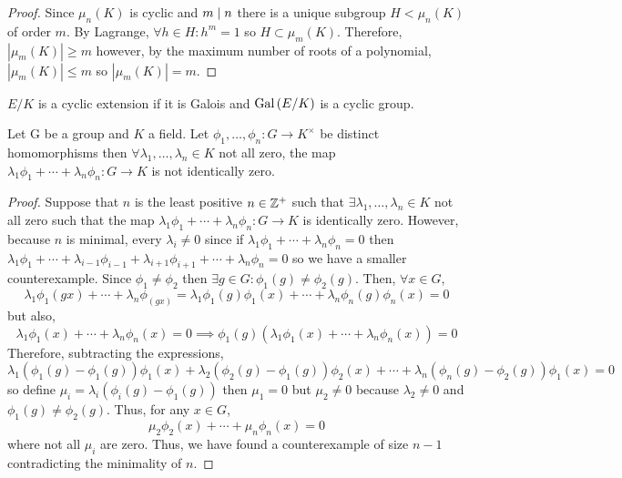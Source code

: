 \documentclass[12pt]{extarticle}
\begin{document}
\begin{proof}
Since $\mu_n(K)$ is cyclic and $m \mid n$ there is a unique subgroup $H < \mu_n(K)$ of order $m$. By Lagrange, $\forall h \in H : h^m = 1$ so $H \subset \mu_m(K)$. Therefore, $|\mu_m(K)| \ge m$ however, by the maximum number of roots of a polynomial, $|\mu_m(K)| \le m$ so $|\mu_m(K)| = m$.  
\end{proof}

\begin{definition}
$E/K$ is a cyclic extension if it is Galois and $\mathrm{Gal}\left( E/K \right)$ is a cyclic group.
\end{definition}

\begin{lemma}
Let G be a group and $K$ a field. Let $\phi_1, \dots, \phi_n : G \to K^\times$ be distinct homomorphisms then $\forall \lambda_1, \dots, \lambda_n \in K$ not all zero, the map $\lambda_1 \phi_1 + \cdots + \lambda_n \phi_n : G \to K$ is not identically zero. 
\end{lemma}

\begin{proof}
Suppose that $n$ is the least positive $n \in \mathbb{Z}^{+}$ such that $\exists \lambda_1, \dots, \lambda_n \in K$ not all zero such that the map $\lambda_1 \phi_1 + \cdots + \lambda_n \phi_n : G \to K$ is identically zero. However, because $n$ is minimal, every $\lambda_i \neq 0$ since if $\lambda_1 \phi_1 + \cdots + \lambda_n \phi_n = 0$ then $\lambda_1 \phi_1 + \cdots  + \lambda_{i-1} \phi_{i-1} + \lambda_{i+1} \phi_{i+1} + \cdots + \lambda_n \phi_n = 0$ so we have a smaller counterexample. Since $\phi_1 \neq \phi_2$ then $\exists g \in G : \phi_1(g) \neq \phi_2(g)$. Then, $\forall x \in G$, 
\[\lambda_1 \phi_1(gx) + \cdots + \lambda_n \phi_(gx) = \lambda_1 \phi_1(g) \phi_1(x) + \cdots + \lambda_n \phi_n(g) \phi_n(x) = 0\]   
but also,
\[\lambda_1 \phi_1(x) + \cdots + \lambda_n \phi_n(x) = 0 \implies \phi_1(g) (\lambda_1 \phi_1(x) + \cdots + \lambda_n \phi_n(x)) = 0\]   
Therefore, subtracting the expressions,
\[ \lambda_1 ( \phi_1(g) - \phi_1(g)) \phi_1(x) + \lambda_2 ( \phi_2(g) - \phi_1(g)) \phi_2(x) + \cdots + \lambda_n ( \phi_n(g) - \phi_2(g)) \phi_1(x) = 0 \]
so define $\mu_i = \lambda_i (\phi_i(g) - \phi_1(g))$ then $\mu_1 = 0$ but $\mu_2 \neq 0$ because $\lambda_2 \neq 0$ and $\phi_1(g) \neq \phi_2(g)$. Thus, for any $x \in G$,
\[ \mu_2 \phi_2(x) + \cdots + \mu_n \phi_n(x) = 0\]
where not all $\mu_i$ are zero. Thus, we have found a counterexample of size $n - 1$ contradicting the minimality of $n$. 
\end{proof}
\end{document}
